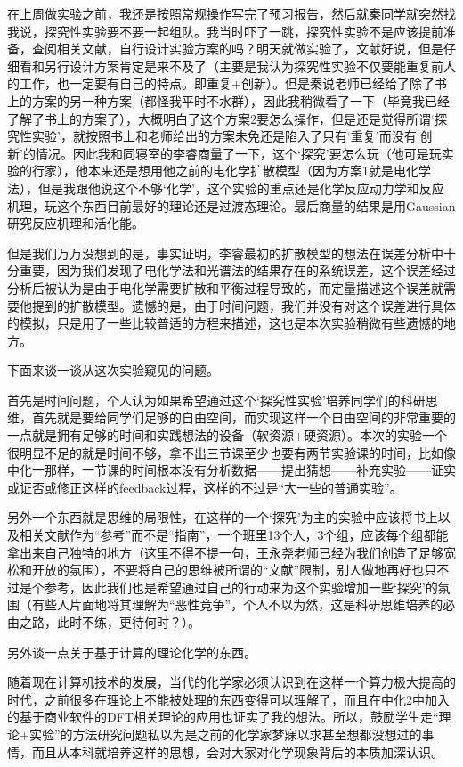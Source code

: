 \documentclass[%
preprint,
 amsmath,amssymb,
 aps,
10.5pt,
]{revtex4-1}
\begin{document}
在上周做实验之前，我还是按照常规操作写完了预习报告，然后就秦同学就突然找我说，探究性实验要不要一起组队。我当时吓了一跳，探究性实验不是应该提前准备，查阅相关文献，自行设计实验方案的吗？明天就做实验了，文献好说，但是仔细看和另行设计方案肯定是来不及了（主要是我认为探究性实验不仅要能重复前人的工作，也一定要有自己的特点。即重复+创新）。但是秦说老师已经给了除了书上的方案的另一种方案（都怪我平时不水群），因此我稍微看了一下（毕竟我已经了解了书上的方案了），大概明白了这个方案2要怎么操作，但是还是觉得所谓‘探究性实验’，就按照书上和老师给出的方案未免还是陷入了只有‘重复’而没有‘创新’的情况。因此我和同寝室的李睿商量了一下，这个‘探究’要怎么玩（他可是玩实验的行家），他本来还是想用他之前的电化学扩散模型（因为方案1就是电化学法），但是我跟他说这个不够‘化学’，这个实验的重点还是化学反应动力学和反应机理，玩这个东西目前最好的理论还是过渡态理论。最后商量的结果是用Gaussian研究反应机理和活化能。

但是我们万万没想到的是，事实证明，李睿最初的扩散模型的想法在误差分析中十分重要，因为我们发现了电化学法和光谱法的结果存在的系统误差，这个误差经过分析后被认为是由于电化学需要扩散和平衡过程导致的，而定量描述这个误差就需要他提到的扩散模型。遗憾的是，由于时间问题，我们并没有对这个误差进行具体的模拟，只是用了一些比较普适的方程来描述，这也是本次实验稍微有些遗憾的地方。

下面来谈一谈从这次实验窥见的问题。

首先是时间问题，个人认为如果希望通过这个‘探究性实验’培养同学们的科研思维，首先就是要给同学们足够的自由空间，而实现这样一个自由空间的非常重要的一点就是拥有足够的时间和实践想法的设备（软资源+硬资源）。本次的实验一个很明显不足的就是时间不够，拿不出三节课至少也要有两节实验课的时间，比如像中化一那样，一节课的时间根本没有分析数据——提出猜想——补充实验——证实或证否或修正这样的feedback过程，这样的不过是“大一些的普通实验”。

另外一个东西就是思维的局限性，在这样的一个‘探究’为主的实验中应该将书上以及相关文献作为“参考”而不是“指南”，一个班里13个人，3个组，应该每个组都能拿出来自己独特的地方（这里不得不提一句，王永尧老师已经为我们创造了足够宽松和开放的氛围），不要将自己的思维被所谓的“文献”限制，别人做地再好也只不过是个参考，因此我们也是希望通过自己的行动来为这个实验增加一些‘探究’的氛围（有些人片面地将其理解为“恶性竞争”，个人不以为然，这是科研思维培养的必由之路，此时不练，更待何时？）。

另外谈一点关于基于计算的理论化学的东西。

随着现在计算机技术的发展，当代的化学家必须认识到在这样一个算力极大提高的时代，之前很多在理论上不能被处理的东西变得可以理解了，而且在中化2中加入的基于商业软件的DFT相关理论的应用也证实了我的想法。所以，鼓励学生走“理论+实验”的方法研究问题私以为是之前的化学家梦寐以求甚至想都没想过的事情，而且从本科就培养这样的思想，会对大家对化学现象背后的本质加深认识。
\end{document}
